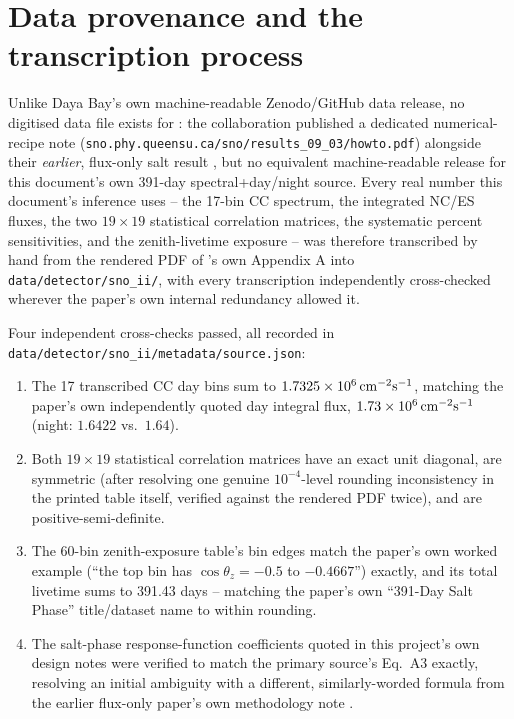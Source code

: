 \section{Data provenance and the transcription process}
\label{sec:data-provenance}

\begin{theorybox}
Unlike Daya Bay's own machine-readable Zenodo/GitHub data release, no
digitised data file exists for \cite{Aharmim2005SaltPhase}: the collaboration
published a dedicated numerical-recipe note
(\texttt{sno.phy.queensu.ca/sno/results\_09\_03/howto.pdf}) alongside their
\emph{earlier}, flux-only salt result \parencite{Ahmed2004SaltFlux}, but no
equivalent machine-readable release for this document's own 391-day
spectral+day/night source. Every real number this document's inference
uses -- the 17-bin CC spectrum, the integrated NC/ES fluxes, the two
$19\times19$ statistical correlation matrices, the systematic percent
sensitivities, and the zenith-livetime exposure -- was therefore transcribed
by hand from the rendered PDF of \cite{Aharmim2005SaltPhase}'s own Appendix A
into \texttt{data/detector/sno\_ii/}, with every transcription independently
cross-checked wherever the paper's own internal redundancy allowed it.
\end{theorybox}

\begin{resultbox}
Four independent cross-checks passed, all recorded in
\texttt{data/detector/sno\_ii/metadata/source.json}:
\begin{enumerate}
  \item The 17 transcribed CC day bins sum to $1.7325\times10^6\,{\rm
    cm^{-2}s^{-1}}$, matching the paper's own independently quoted day
    integral flux, $1.73\times10^6\,{\rm cm^{-2}s^{-1}}$ (night: $1.6422$
    vs.\ $1.64$).
  \item Both $19\times19$ statistical correlation matrices have an exact
    unit diagonal, are symmetric (after resolving one genuine
    $10^{-4}$-level rounding inconsistency in the printed table itself,
    verified against the rendered PDF twice), and are positive-semi-definite.
  \item The 60-bin zenith-exposure table's bin edges match the paper's own
    worked example (``the top bin has $\cos\theta_z=-0.5$ to $-0.4667$'')
    exactly, and its total livetime sums to 391.43 days -- matching the
    paper's own ``391-Day Salt Phase'' title/dataset name to within
    rounding.
  \item The salt-phase response-function coefficients quoted in this
    project's own design notes were verified to match the primary source's
    Eq.~A3 exactly, resolving an initial ambiguity with a different,
    similarly-worded formula from the earlier flux-only paper's own
    methodology note \parencite{Ahmed2004SaltFlux}.
\end{enumerate}
\end{resultbox}

